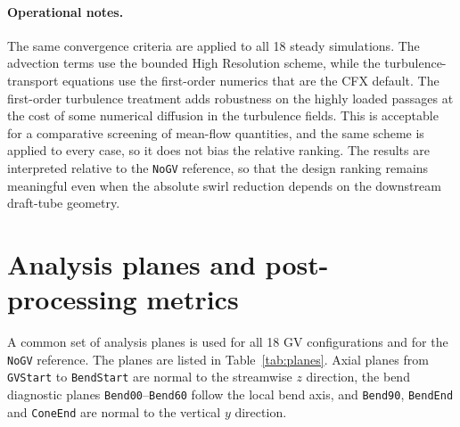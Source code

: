 \paragraph{Operational notes.}
The same convergence criteria are applied to all 18 steady simulations. The advection terms use the bounded High Resolution scheme, while the turbulence-transport equations use the first-order numerics that are the CFX default. The first-order turbulence treatment adds robustness on the highly loaded passages at the cost of some numerical diffusion in the turbulence fields. This is acceptable for a comparative screening of mean-flow quantities, and the same scheme is applied to every case, so it does not bias the relative ranking. The results are interpreted relative to the \texttt{NoGV} reference, so that the design ranking remains meaningful even when the absolute swirl reduction depends on the downstream draft-tube geometry.
 
\section{Analysis planes and post-processing metrics}
\label{sec:methods_planes_metrics}

A common set of analysis planes is used for all 18 GV configurations and for the \texttt{NoGV} reference. The planes are listed in Table~\ref{tab:planes}. Axial planes from \texttt{GVStart} to \texttt{BendStart} are normal to the streamwise $z$ direction, the bend diagnostic planes \texttt{Bend00}--\texttt{Bend60} follow the local bend axis, and \texttt{Bend90}, \texttt{BendEnd} and \texttt{ConeEnd} are normal to the vertical $y$ direction.

